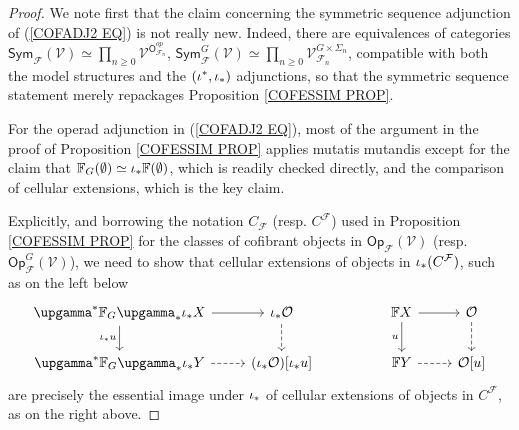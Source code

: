 \documentclass[a4paper,10pt]{article}%
\begin{document}
\begin{proof}
We note first that the claim concerning the symmetric sequence adjunction of (\ref{COFADJ2 EQ})
is not really new. Indeed, there are equivalences of categories
$
\mathsf{Sym}_{\mathcal{F}}(\mathcal{V})
\simeq \prod_{n \geq 0}
\mathcal{V}^{\mathsf{O}^{op}_{\mathcal{F}_n}}
$,
$
\mathsf{Sym}^G_{\mathcal{F}}(\mathcal{V})
\simeq \prod_{n \geq 0}
\mathcal{V}_{\mathcal{F}_n}^{G \times \Sigma_n}
$,
compatible with both the model structures and the $(\iota^{\**},\iota_{\**})$ adjunctions, 
so that the symmetric sequence statement merely repackages 
Proposition \ref{COFESSIM PROP}.

For the operad adjunction in (\ref{COFADJ2 EQ}),
most of the argument in the proof of
Proposition \ref{COFESSIM PROP}
applies mutatis mutandis
except for the claim that 
$\mathbb{F}_G (\emptyset) \simeq \iota_{\**} \mathbb{F} (\emptyset)$, which is readily checked directly, 
and the comparison of cellular extensions,
which is the key claim.


Explicitly, and borrowing the notation
$C_{\mathcal{F}}$ (resp. $C^{\mathcal{F}}$) used in Proposition \ref{COFESSIM PROP} for the 
classes of cofibrant objects in 
$\mathsf{Op}_{\mathcal{F}}(\mathcal{V})$ 
(resp. $\mathsf{Op}_{\mathcal{F}}^G(\mathcal{V})$),
we need to show that cellular extensions of objects in 
$\iota_{\**}(C^{\mathcal{F}})$, such as on the left below
\begin{equation}\label{TWOCELLEXT EQ}
\begin{tikzcd}
	\upgamma^* \mathbb{F}_G \upgamma_* \iota_{\**} X \ar{d}[swap]{\iota_{\**}u} \ar{r} &
	\iota_{\**} \mathcal{O} \ar[dashed]{d} & &
	\mathbb{F} X \ar{d}[swap]{u} \ar{r} &
	\mathcal{O} \ar[dashed]{d}
\\
	\upgamma^* \mathbb{F}_G \upgamma_* \iota_{\**} Y  \ar[dashed]{r}&
	(\iota_{\**} \mathcal{O})[\iota_{\**} u]& &
	\mathbb{F} Y \ar[dashed]{r}&
	\mathcal{O}[u]
\end{tikzcd}
\end{equation}
are precisely the essential image under $\iota_{\**}$ of cellular extensions of objects in $C^{\mathcal{F}}$, as on the right above.


\end{proof}
\end{document}
